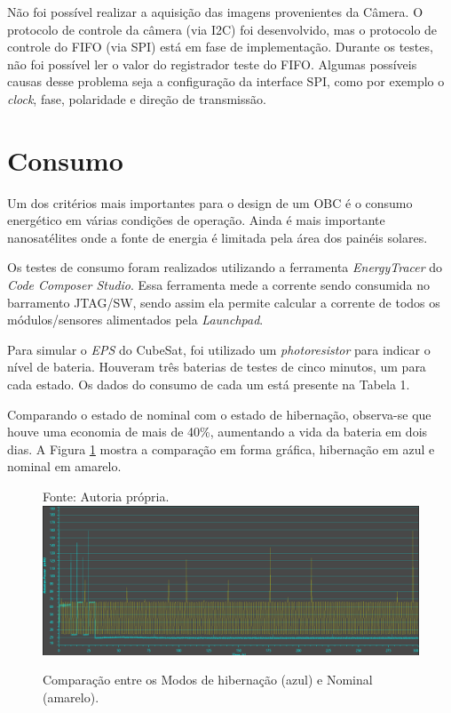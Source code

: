 Não foi possível realizar a aquisição das imagens provenientes da Câmera. O protocolo de controle da câmera (via I2C)  foi desenvolvido, mas o protocolo de controle do FIFO (via SPI) está em fase de implementação. Durante os testes, não foi possível ler o valor do registrador teste do FIFO. Algumas possíveis causas desse problema seja a configuração da interface SPI, como por exemplo o \textit{clock}, fase, polaridade e direção de transmissão. 

\section{Consumo}

Um dos critérios mais importantes para o design de um OBC é o consumo energético em várias condições de operação. Ainda é mais importante nanosatélites onde a fonte de energia é limitada pela área dos painéis solares. 

Os testes de consumo foram realizados utilizando a ferramenta \textit{EnergyTracer} do \textit{Code Composer Studio}. Essa ferramenta mede a corrente sendo consumida no barramento JTAG/SW, sendo assim ela permite calcular a corrente de todos os módulos/sensores alimentados pela \textit{Launchpad}. 

Para simular o \textit{EPS} do CubeSat, foi utilizado um \textit{photoresistor} para indicar o nível de bateria. Houveram três baterias de testes de cinco minutos, um para cada estado. Os dados do consumo de cada um está presente na Tabela 1.

Comparando o estado de nominal com o estado de hibernação, observa-se que houve uma economia de mais de 40\%, aumentando a vida da bateria em dois dias. A Figura \ref{hibernatexNormal} mostra a comparação em forma gráfica, hibernação em azul e nominal em amarelo.

\begin{figure}[h]
\footnotesize{	
	\centering
			\centering
	\footnotesize{Fonte: Autoria própria.}
	\includegraphics[keepaspectratio=true,scale=0.470]{figuras/hibernatexNormal.PNG}
	\caption{Comparação entre os Modos de hibernação (azul) e Nominal (amarelo).}
	\label{hibernatexNormal}
}
\end{figure}
\FloatBarrier

